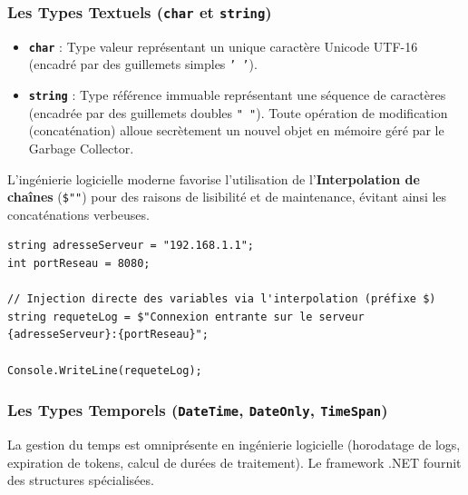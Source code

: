 \subsubsection{Les Types Textuels (\texttt{char} et \texttt{string})}
\begin{itemize}
    \item \textbf{\texttt{char}} : Type valeur représentant un unique caractère Unicode UTF-16 (encadré par des guillemets simples \texttt{'\ '}).
    \item \textbf{\texttt{string}} : Type référence immuable représentant une séquence de caractères (encadrée par des guillemets doubles \texttt{"\ "}). Toute opération de modification (concaténation) alloue secrètement un nouvel objet en mémoire géré par le Garbage Collector.
\end{itemize}

L'ingénierie logicielle moderne favorise l'utilisation de l'\textbf{Interpolation de chaînes} (\texttt{\$"{}"}) pour des raisons de lisibilité et de maintenance, évitant ainsi les concaténations verbeuses.

\begin{lstlisting}[caption={Interpolation de chaînes de caractères}]
string adresseServeur = "192.168.1.1";
int portReseau = 8080;

// Injection directe des variables via l'interpolation (préfixe $)
string requeteLog = $"Connexion entrante sur le serveur {adresseServeur}:{portReseau}";

Console.WriteLine(requeteLog);
\end{lstlisting}
\subsubsection{Les Types Temporels (\texttt{DateTime}, \texttt{DateOnly}, \texttt{TimeSpan})}

La gestion du temps est omniprésente en ingénierie logicielle (horodatage de logs, expiration de tokens, calcul de durées de traitement). Le framework .NET fournit des structures spécialisées.

